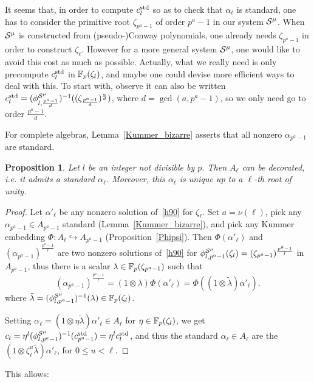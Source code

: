 \documentclass{sig-alternate}
\newtheorem{proposition}[theorem]{Proposition}
\begin{document}
It seems that, in order to compute $c^{\textrm{std}}_l$
so as to check that $\alpha_\ell$ is standard, one has to
consider the primitive root $\zeta_{p^a-1}$ of order $p^a-1$ in our
system $\mathcal{S}^\mu$.
When $\mathcal{S}^\mu$ is constructed from (pseudo-)Conway polynomials,
one already needs $\zeta_{p^a-1}$ in order to construct $\zeta_\ell$.
However for a more general system $\mathcal{S}^\mu$, one would like to avoid this cost
as much as possible.
Actually, what we really need is only
precompute $c^{\textrm{std}}_l$ in $\mathbb{F}_p(\zeta_l)$,
and maybe one could devise more efficient ways to deal with this.
To start with, observe it can also be written
$c^{\textrm{std}}_l=({\phi^{\mathcal{S}^\mu}_{{l},{\frac{p^a-1}{d}}}})^{-1}((\zeta_{\frac{p^a-1}{d}})^{\frac{a}{d}})$,
where $d=\gcd(a,p^a-1)$, so we only need go to order $\frac{p^a-1}{d}$.

For complete algebras, Lemma~\ref{Kummer_bizarre} asserts that all nonzero $\alpha_{p^a-1}$ are standard.
\begin{proposition}
\label{standardexiste}
Let $l$ be an integer not divisible by $p$.
Then $A_\ell$ can be decorated, i.e. it admits a standard $\alpha_\ell$.
Moreover, this $\alpha_\ell$ is unique up to a $\ell$-th root of unity.
\end{proposition}
\begin{proof}
Let $\alpha'_\ell$ be any nonzero solution of~\eqref{h90} for $\zeta_\ell$.
Set $a=\nu(\ell)$, pick any $\alpha_{p^a-1}\in A_{p^a-1}$ standard (Lemma~\ref{Kummer_bizarre}),
and pick any Kummer embedding $\Phi:A_\ell\hookrightarrow A_{p^a-1}$ (Proposition~\ref{Phipsi}).
Then $\Phi(\alpha'_\ell)$ and $(\alpha_{p^a-1})^{\frac{p^a-1}{\ell}}$ are two nonzero solutions of~\eqref{h90}
for ${\phi^{\mathcal{S}^\mu}_{{l},{p^a-1}}}(\zeta_l)=(\zeta_{p^a-1})^{\frac{p^a-1}{l}}$ in $A_{p^a-1}$, thus there is a scalar $\lambda\in\mathbb{F}_{p}(\zeta_{p^a-1})$
such that
\begin{equation*}
(\alpha_{p^a-1})^{\frac{p^a-1}{\ell}}=(1\otimes\lambda)\Phi(\alpha'_\ell)=\Phi((1\otimes\tilde\lambda)\alpha'_\ell).
\end{equation*}
where $\tilde\lambda=({\phi^{\mathcal{S}^\mu}_{{l},{p^a-1}}})^{-1}(\lambda)\in\mathbb{F}_{p}(\zeta_{l})$.

Setting $\alpha_\ell=(1\otimes\eta\tilde\lambda)\alpha'_\ell\in A_\ell$ for $\eta\in\mathbb{F}_{p}(\zeta_l)$,
we get $c_{l}=\eta^l({\phi^{\mathcal{S}^\mu}_{{l},{p^a-1}}})^{-1}(c^{\textrm{std}}_{p^a-1})=\eta^lc^{\textrm{std}}_l$, and
thus the standard $\alpha_\ell\in A_\ell$ are the $(1\otimes\zeta_\ell^u\tilde\lambda)\alpha'_\ell$, for $0\leq u<\ell$.
\end{proof}
This allows:
\end{document}
